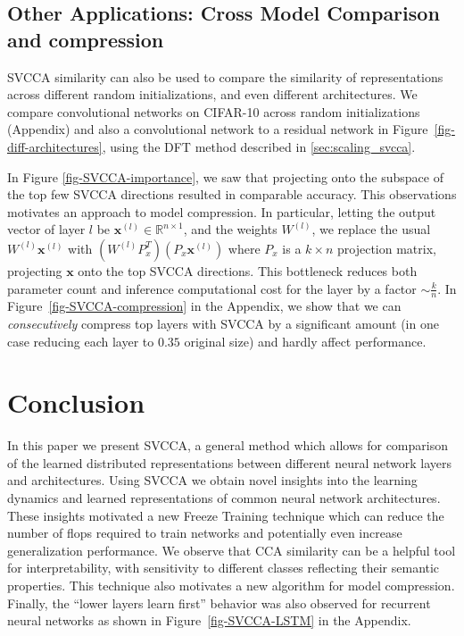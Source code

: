 \documentclass{article} %
\begin{document}
\subsection{Other Applications: Cross Model Comparison and compression} \label{sec-diff-architectures}
\label{sec-model-compression}
SVCCA similarity can also be used to compare the similarity of representations across different random initializations, and even different architectures. We compare convolutional networks on CIFAR-10 across random initializations (Appendix) and also a convolutional network to a residual network in Figure~\ref{fig-diff-architectures}, using the DFT method described in \ref{sec:scaling_svcca}. 

In Figure \ref{fig-SVCCA-importance}, we saw that projecting onto the subspace of the top few SVCCA directions resulted in comparable accuracy. This observations motivates an approach to model compression. In particular, letting the output vector of layer $l$ be $\pmb{x}^{(l)} \in \mathbb{R}^{n\times 1}$, and the weights $W^{(l)}$, we replace the usual $W^{(l)} \pmb{x}^{(l)}$ with  $(W^{(l)} P_x^T) (P_x \pmb{x}^{(l)})$ where $P_x$ is a $k \times n$ projection matrix, projecting  $\pmb{x}$ onto the top SVCCA directions. This bottleneck reduces both parameter count and inference computational cost for the layer by a factor $\sim \frac{k}{n}$. In Figure~\ref{fig-SVCCA-compression} in the Appendix, 
we show that we can \textit{consecutively} compress top layers with SVCCA by a significant amount (in one case reducing each layer to $0.35$ original size) and hardly affect performance. 

\vspace*{-0.2em}
\section{Conclusion}
\vspace*{-0.4em}
  In this paper we present SVCCA, a general method which allows for comparison of the learned distributed representations between different neural network layers and architectures. Using SVCCA we obtain novel insights into the learning dynamics and learned representations of common neural network architectures. These insights motivated a new Freeze Training technique which can reduce the number of flops required to train networks and potentially even increase generalization performance. We observe that CCA similarity can be a helpful tool for interpretability, with sensitivity to different classes reflecting their semantic properties. This technique also motivates a new algorithm for model compression. Finally, the ``lower layers learn first'' behavior was also observed for recurrent neural networks as shown in Figure~\ref{fig-SVCCA-LSTM} in the Appendix.
\end{document}
